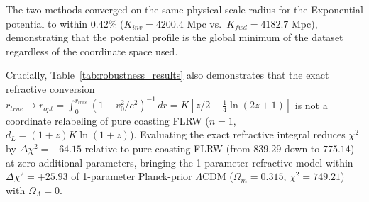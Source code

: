 \documentclass[11pt]{article}
\begin{document}
The two methods converged on the same physical scale radius for the Exponential potential to within $0.42\%$ ($K_{inv} = 4200.4$ Mpc vs.\ $K_{fwd} = 4182.7$ Mpc), demonstrating that the potential profile is the global minimum of the dataset regardless of the coordinate space used. 

Crucially, Table~\ref{tab:robustness_results} also demonstrates that the exact refractive conversion $r_{true} \to r_{opt} = \int_0^{r_{true}} (1 - v_0^2/c^2)^{-1}\,dr = K[z/2 + \frac{1}{4}\ln(2z+1)]$ is not a coordinate relabeling of pure coasting FLRW ($n = 1$, $d_L = (1+z)K\ln(1+z)$). Evaluating the exact refractive integral reduces $\chi^2$ by $\Delta\chi^2 = -64.15$ relative to pure coasting FLRW (from $839.29$ down to $775.14$) at zero additional parameters, bringing the 1-parameter refractive model within $\Delta\chi^2 = +25.93$ of 1-parameter Planck-prior $\Lambda$CDM ($\Omega_m = 0.315$, $\chi^2 = 749.21$) with $\Omega_\Lambda = 0$.

\begin{table}[h]
    \centering
    \renewcommand{\arraystretch}{1.25} 
    \caption{\textbf{Statistical Robustness and Pantheon+ $\chi^2$ Model Comparison ($N=1701$).} Comparison of inverse velocity reconstruction ($r_{true}$) against forward $\chi^2$ minimization of weighted magnitude residuals under the exact metric refractive index $n = (1 - v_0^2/c^2)^{-1}$, alongside standard cosmological baselines.}
    \label{tab:robustness_results}
\end{table}
\end{document}
